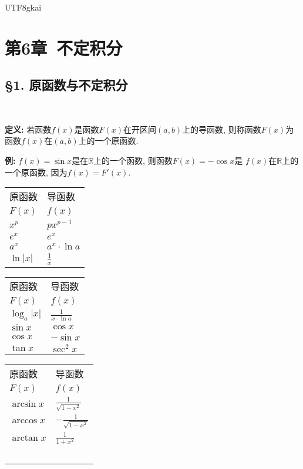 \documentclass{article}
\begin{document}
\begin{CJK*}{UTF8}{gkai}
\section*{第6章\ 不定积分}
\subsection*{\S 1. 原函数与不定积分} \ 

\vspace{-3em}
\textbf{定义: }若函数$f(x)$是函数$ F(x) $在开区间$ \left(a, b\right) $上的导函数,
则称函数$F(x)$为函数$f(x)$在$(a,b)$上的一个原函数.

\textbf{例: } $ f(x) = \sin x $是在$\mathbb{R}$上的一个函数, 则函数$ F(x) = -\cos x $是
$ f(x) $在$ \mathbb{R} $上的一个原函数, 因为$ f(x) = F'(x) $.

\begin{table*}[h]
	\caption*{导数表}
	\centering
	\begin{tabular}{ l l }
		原函数		&	导函数 \\
		$F(x)$		&	$f(x)$ \\
		$x^p$		&	$px^{p-1}$ \\
		$e^x$		&	$e^x$ \\
		$a^x$		&	$a^x \cdot \ln a$ \\
		$\ln |x|$	&	$\frac{1}{x}$
	\end{tabular}
	\begin{tabular}{ l l }
		原函数			&	导函数 \\
		$F(x)$			&	$f(x)$ \\
		$\log_a |x|$	&	$\frac{1}{x \cdot \ln a}$ \\
		$\sin x$		&	$\cos x$ \\
		$\cos x$		&	$-\sin x$ \\
		$\tan x$		&	$\sec^2 x$
	\end{tabular}
	\begin{tabular}{ l l }
		原函数		&	导函数 \\
		$F(x)$		&	$f(x)$ \\
		$\arcsin x$	&	$\frac{1}{\sqrt{1-x^2}}$ \\
		$\arccos x$&	$-\frac{1}{\sqrt{1-x^2}}$ \\
		$\arctan x$&	$\frac{1}{1+x^2}$ \\ \ 
	\end{tabular}
\end{table*}


\end{CJK*}
\end{document}
